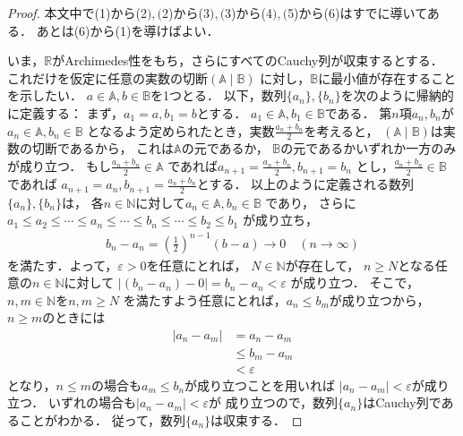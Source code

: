      \begin{proof}
       本文中で(1)から(2$),($2)から(3$),($3)から(4$),($5)から(6)はすでに導いてある．
       あとは(6)から(1)を導けばよい．

       いま，$\mathbb{R}$がArchimedes性をもち，さらにすべてのCauchy列が収束するとする．
       これだけを仮定に任意の実数の切断$( \mathbb{A} \mid \mathbb{B} )$
       に対し，$\mathbb{B}$に最小値が存在することを示したい．
       $a \in \mathbb{A} ,  b \in \mathbb{B}$を1つとる．
       以下，数列$\{ a_n \},  \{ b_n \}$を次のように帰納的に定義する：
       まず，$a_1 = a ,  b_1 = b$とする．
       $a_1 \in \mathbb{A} ,  b_1 \in \mathbb{B}$である．
       第$n$項$a_n ,  b_n$が$a_n \in \mathbb{A} ,  b_n \in \mathbb{B}$
       となるよう定められたとき，実数$\displaystyle \frac{a_n + b_n}{2}$を考えると，
       $( \mathbb{A} \mid \mathbb{B} )$は実数の切断であるから，
       これは$\mathbb{A}$の元であるか，
       $\mathbb{B}$の元であるかいずれか一方のみが成り立つ．
       もし$\displaystyle \frac{a_n +b_n }{2} \in \mathbb{A}$
       であれば$\displaystyle a_{n+1} = \frac{a_n + b_n}{2} ,  b_{n+1} = b_n $
       とし，$\displaystyle \frac{a_n + b_n }{2} \in \mathbb{B}$であれば
       $\displaystyle a_{n+1} = a_n ,  b_{n+1} = \frac{a_n +b_n}{2}$とする．
       以上のように定義される数列$\{ a_n \} ,  \{ b_n \}$は，
       各$n \in \mathbb{N}$に対して$a_n \in \mathbb{A} ,  b_n \in \mathbb{B}$
       であり，
       さらに$a_1 \leq a_2 \leq \cdots \leq a_n \leq \cdots \leq b_n \leq \cdots \leq b_2 \leq b_1$
       が成り立ち，
       \begin{align*}
         b_n - a_n = \left ( \frac{1}{2} \right) ^{n-1} (b-a) 
         \to 0 \quad ( n \to \infty )
       \end{align*}
       を満たす．よって，$\varepsilon >0$を任意にとれば，
       $N \in \mathbb{N}$が存在して，
       $n \geq N$となる任意の$n \in \mathbb{N}$に対して
       $\lvert (b_n - a_n)-0 \rvert = b_n - a_n < \varepsilon$
       が成り立つ．
       そこで，$n,  m \in \mathbb{N}$を$n,m \geq N$
       を満たすよう任意にとれば，$a_n \leq b_m$が成り立つから，
       $n \geq m$のときには
       \begin{align*}
         \lvert a_n - a_m \rvert 
         & = a_n - a_m \\
         & \leq b_m - a_m \\
         & < \varepsilon
       \end{align*}
       となり，$n \leq m$の場合も$a_m \leq b_n$が成り立つことを用いれば
       $\lvert a_n - a_m \rvert < \varepsilon$が成り立つ．
       いずれの場合も$\lvert a_n - a_m \rvert < \varepsilon$が
       成り立つので，数列$\{ a_n \}$はCauchy列であることがわかる．
       従って，数列$\{ a_n \}$は収束する．
      

\end{proof}
